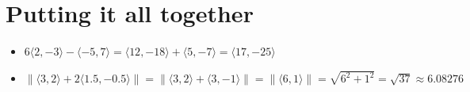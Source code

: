 \documentclass{article}
\begin{document}
\section*{Putting it all together}

\begin{itemize}
\item \(6\langle 2, -3 \rangle - \langle -5, 7 \rangle = \langle 12, -18 \rangle + \langle 5, -7 \rangle = \langle 17, -25 \rangle\)
\item \(\|\langle 3, 2 \rangle + 2\langle 1.5, -0.5 \rangle\| = \|\langle 3, 2 \rangle + \langle 3, -1 \rangle\| = \|\langle 6, 1 \rangle\| = \sqrt{6^2 + 1^2} = \sqrt{37} \approx 6.08276\)
\end{itemize}
\end{document}
